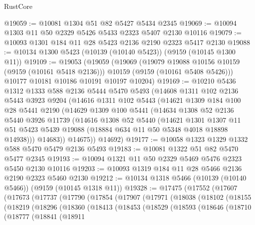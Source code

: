 \begin{lexlean}{RustCore}
\begin{coremodule}
@19059 := @10081 @1304 @51 @82 @5427 @5434 @2345
@19069 := @10094 @1303 @11 @50 @2329 @5426 @5433 @2323 @5407 @2130 @10116
@19079 := @10093 @1301 @184 @11 @28 @5423 @2136 @2190 @2323 @5417 @2130
@19088 := @10134 @1300 @5423 (@10139 (@10140 @5423)) (@9159 (@10145 @1300 @11))
@19109 := @19053
    (@19059
      (@19069
        (@19079 @19088 @10156 @10159 (@9159 (@10161 @5418 @2136)))
        @10159
        (@9159 (@10161 @5408 @5426)))
      @10177
      @10181
      @10186
      @10191
      @10197
      @10204)
@19169 := @10210
    @5436
    @1312
    @1333
    @588
    @2136
    @5444
    @5470
    @5493
    (@14608
      @1311
      @102
      @2136
      @5443
      @3923
      @9204
      (@14616
        @1311
        @102
        @5443
        (@14621
          @1309
          @184
          @100
          @28
          @5441
          @2190
          (@14629
            @1309
            @100
            @5441
            (@14634
              @1308
              @52
              @2136
              @5440
              @3926
              @11739
              (@14616
                @1308
                @52
                @5440
                (@14621
                  @1301
                  @1307
                  @11
                  @51
                  @5423
                  @5439
                  @19088
                  (@18884 @634 @11 @50 @5348 @4018 @18898 @14938)))
              @14683))
          @14675))
      @14692)
@19177 := @10058 @1323 @1329 @1332 @588 @5470 @5479 @2136 @5493
@19183 := @10081 @1322 @51 @82 @5470 @5477 @2345
@19193 := @10094 @1321 @11 @50 @2329 @5469 @5476 @2323 @5450 @2130 @10116
@19203 := @10093 @1319 @184 @11 @28 @5466 @2136 @2190 @2323 @5460 @2130
@19212 := @10134 @1318 @5466 (@10139 (@10140 @5466)) (@9159 (@10145 @1318 @11))
@19328 := @17475
    (@17552
      (@17607
        (@17673
          (@17737
            (@17790
              (@17854
                (@17907
                  (@17971
                    (@18038
                      (@18102
                        (@18155
                          (@18219
                            (@18296
                              (@18360
                                (@18413
                                  (@18453
                                    (@18529
                                      (@18593
                                        (@18646
                                          (@18710
                                            (@18777
                                              (@18841
                                                (@18911

\end{coremodule}
\end{lexlean}
